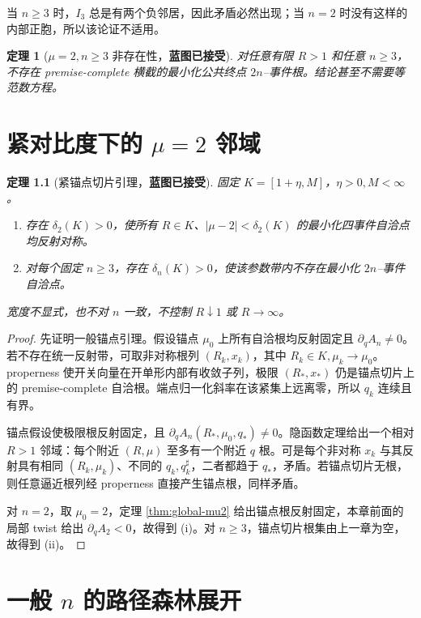 \documentclass[UTF8,12pt,openany,fontset=fandol]{ctexrep}
\newtheorem{theorem}{定理}[chapter]
\theoremstyle{definition}
\newcommand{\Trusted}{\textcolor{green!45!black}{\textbf{蓝图已接受}}}
\begin{document}
当 $n\ge3$ 时，$I_3$ 总是有两个负邻居，因此矛盾必然出现；当 $n=2$ 时没有这样的内部正胞，所以该论证不适用。

\begin{theorem}[$\mu=2,n\ge3$ 非存在性，\Trusted]
对任意有限 $R>1$ 和任意 $n\ge3$，不存在 premise-complete 横截的最小化公共终点 $2n$--事件根。结论甚至不需要等范数方程。
\end{theorem}

\chapter{紧对比度下的 $\mu=2$ 邻域}

\begin{theorem}[紧锚点切片引理，\Trusted]\label{thm:compact-strip}
固定 $K=[1+\eta,M]$，$\eta>0,M<\infty$。
\begin{enumerate}[label=(\roman*)]
  \item 存在 $\delta_2(K)>0$，使所有 $R\in K$、$|\mu-2|<\delta_2(K)$ 的最小化四事件自洽点均反射对称。
  \item 对每个固定 $n\ge3$，存在 $\delta_n(K)>0$，使该参数带内不存在最小化 $2n$--事件自洽点。
\end{enumerate}
宽度不显式，也不对 $n$ 一致，不控制 $R\downarrow1$ 或 $R\to\infty$。
\end{theorem}

\begin{proof}
先证明一般锚点引理。假设锚点 $\mu_0$ 上所有自洽根均反射固定且 $\partial_qA_n\ne0$。若不存在统一反射带，可取非对称根列 $(R_k,x_k)$，其中 $R_k\in K,\mu_k\to\mu_0$。properness 使开关向量在开单形内部有收敛子列，极限 $(R_*,x_*)$ 仍是锚点切片上的 premise-complete 自洽根。端点归一化斜率在该紧集上远离零，所以 $q_k$ 连续且有界。

锚点假设使极限根反射固定，且 $\partial_qA_n(R_*,\mu_0,q_*)\ne0$。隐函数定理给出一个相对 $R>1$ 邻域：每个附近 $(R,\mu)$ 至多有一个附近 $q$ 根。可是每个非对称 $x_k$ 与其反射具有相同 $(R_k,\mu_k)$、不同的 $q_k,q_k^\sharp$，二者都趋于 $q_*$，矛盾。若锚点切片无根，则任意逼近根列经 properness 直接产生锚点根，同样矛盾。

对 $n=2$，取 $\mu_0=2$，定理 \ref{thm:global-mu2} 给出锚点根反射固定，本章前面的局部 twist 给出 $\partial_qA_2<0$，故得到 (i)。对 $n\ge3$，锚点切片根集由上一章为空，故得到 (ii)。
\end{proof}

\chapter{一般 $n$ 的路径森林展开}
\end{document}
